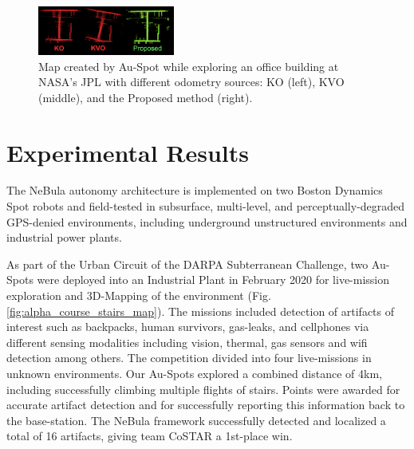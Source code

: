\documentclass[letterpaper, 10pt, conference]{ieeeconf}      %
\newcommand{\todo}[1]{{\color{red} #1 }} %
\newcommand{\inst}[1]{{\color{orange} #1 }} %
\newcommand{\rev}[1]{{\color{blue}#1}} %
\begin{document}
\begin{figure}[t!]
  \centering
  \includegraphics[width=0.4\textwidth]{spot_iros/graphics/spot_proposed_office.PNG}
  \caption{Map created by Au-Spot while exploring an office building at NASA's JPL with different odometry sources: KO (left), KVO (middle), and the Proposed method (right).}
  \label{spot_indoor_office}
\end{figure}

\section{Experimental Results}\label{sec:experiments}

The NeBula autonomy architecture is implemented on two Boston Dynamics Spot robots and  field-tested in subsurface, multi-level, and perceptually-degraded GPS-denied environments, including underground unstructured environments and industrial power plants.

As part of the Urban Circuit of the DARPA Subterranean Challenge, two Au-Spots were deployed into an Industrial Plant in February 2020 for live-mission exploration and  3D-Mapping of the environment (Fig. \ref{fig:alpha_course_stairs_map}).  The missions included detection of artifacts of interest such as backpacks, human survivors, gas-leaks, and cellphones via different sensing modalities including vision, thermal, gas sensors and wifi detection among others. The competition divided into four live-missions in unknown environments. %
Our Au-Spots explored a combined distance of 4km, including successfully climbing multiple flights of stairs. Points were awarded for accurate artifact detection and for successfully reporting this information back to the base-station.   
The NeBula framework successfully detected and localized a total of 16 artifacts, giving team CoSTAR a 1st-place win.
\end{document}
